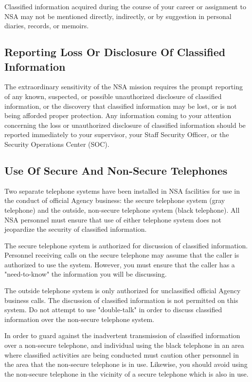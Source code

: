 \documentclass[a4]{article}
\begin{document}
Classified information acquired during the course of your career or assignment
to NSA may not be mentioned directly, indirectly, or by suggestion in personal
diaries, records, or memoirs.

\subsection{Reporting Loss Or Disclosure Of Classified Information}

The extraordinary sensitivity of the NSA mission requires the prompt reporting
of any known, suspected, or possible unauthorized disclosure of classified
information, or the discovery that classified information may be lost, or is
not being afforded proper protection.  Any information coming to your
attention concerning the loss or unauthorized disclosure of classified
information should be reported immediately to your supervisor, your Staff
Security Officer, or the Security Operations Center (SOC).

\subsection{Use Of Secure And Non-Secure Telephones}

Two separate telephone systems have been installed in NSA facilities for use in
the conduct of official Agency business:  the secure telephone system (gray
telephone) and the outside, non-secure telephone system (black telephone).  All
NSA personnel must ensure that use of either telephone system does not
jeopardize the security of classified information.

The secure telephone system is authorized for discussion of classified
information.  Personnel receiving calls on the secure telephone may assume that
the caller is authorized to use the system.  However, you must ensure that the
caller has a "need-to-know" the information you will be discussing.

The outside telephone system is only authorized for unclassified official
Agency business calls.  The discussion of classified information is not
permitted on this system.  Do not attempt to use "double-talk" in order to
discuss classified information over the non-secure telephone system.

In order to guard against the inadvertent transmission of classified
information over a non-secure telephone, and individual using the black
telephone in an area where classified activities are being conducted must
caution other personnel in the area that the non-secure telephone is in use.
Likewise, you should avoid using the non-secure telephone in the vicinity of a
secure telephone which is also in use.
\end{document}

